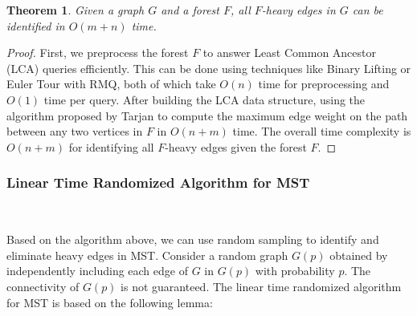 \documentclass[11pt]{article}
\theoremstyle{plain}
\newtheorem{theorem}{Theorem}[section]
\begin{document}
\begin{theorem}
    \label{theorem:heavy}
    Given a graph $G$ and a forest $F$, all $F$-heavy edges in $G$ can be identified in $O(m+n)$ time.
\end{theorem}
\begin{proof}
    First, we preprocess the forest $F$ to answer Least Common Ancestor (LCA) queries efficiently. This can be done using techniques like Binary Lifting or Euler Tour with RMQ, both of which take $O(n)$ time for preprocessing and $O(1)$ time per query\cite{bender2000lca}. After building the LCA data structure, using the algorithm proposed by Tarjan\cite{doi:10.1137/0221070} to compute the maximum edge weight on the path between any two vertices in $F$ in $O(n+m)$ time. The overall time complexity is $O(n + m)$ for identifying all $F$-heavy edges given the forest $F$.
\end{proof}

\subsubsection{Linear Time Randomized Algorithm for MST}\

Based on the algorithm above, we can use random sampling to identify and eliminate heavy edges in MST. Consider a random graph $G(p)$ obtained by independently including each edge of $G$ in $G(p)$ with probability $p$. The connectivity of $G(p)$ is not guaranteed. The linear time randomized algorithm for MST is based on the following lemma:
\end{document}
